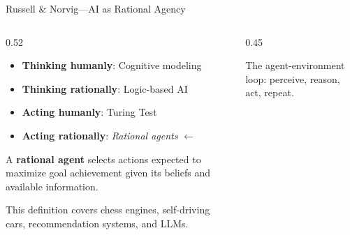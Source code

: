 ﻿\documentclass[aspectratio=169,11pt]{beamer}
\begin{document}
\begin{frame}{Russell \& Norvig---AI as Rational Agency \parencite{russell_norvig_ai}}
\begin{columns}[T]
\begin{column}{0.52\textwidth}
\begin{conceptbox}
\scriptsize
\begin{itemize}
    \item \textbf{Thinking humanly}: Cognitive modeling
    \item \textbf{Thinking rationally}: Logic-based AI
    \item \textbf{Acting humanly}: Turing Test
    \item \textbf{Acting rationally}: \emph{Rational agents} $\leftarrow$
\end{itemize}
\end{conceptbox}

\vspace{0.2em}
A \textbf{rational agent} selects actions expected to maximize goal achievement given its beliefs and available information.

\vspace{0.2em}
This definition covers chess engines, self-driving cars, recommendation systems, and LLMs.
\end{column}
\begin{column}{0.45\textwidth}
\begin{center}
\end{center}

{\scriptsize The agent-environment loop: perceive, reason, act, repeat.}
\end{column}
\end{columns}
\end{frame}
\end{document}
